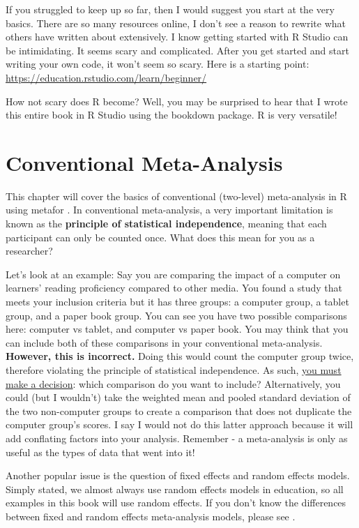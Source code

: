 \documentclass[
]{book}
\begin{document}
If you struggled to keep up so far, then I would suggest you start at the very basics. There are so many resources online, I don't see a reason to rewrite what others have written about extensively. I know getting started with R Studio can be intimidating. It seems scary and complicated. After you get started and start writing your own code, it won't seem so scary. Here is a starting point: \url{https://education.rstudio.com/learn/beginner/}

How not scary does R become? Well, you may be surprised to hear that I wrote this entire book in R Studio using the bookdown package. R is very versatile!

\hypertarget{meta}{%
\chapter{Conventional Meta-Analysis}\label{meta}}

This chapter will cover the basics of conventional (two-level) meta-analysis in R using metafor \citep{viechtbauer2010}. In conventional meta-analysis, a very important limitation is known as the \textbf{principle of statistical independence}, meaning that each participant can only be counted once. What does this mean for you as a researcher?

Let's look at an example: Say you are comparing the impact of a computer on learners' reading proficiency compared to other media. You found a study that meets your inclusion criteria but it has three groups: a computer group, a tablet group, and a paper book group. You can see you have two possible comparisons here: computer vs tablet, and computer vs paper book. You may think that you can include both of these comparisons in your conventional meta-analysis. \textbf{However, this is incorrect.} Doing this would count the computer group twice, therefore violating the principle of statistical independence. As such, \ul{you must make a decision}: which comparison do you want to include? Alternatively, you could (but I wouldn't) take the weighted mean and pooled standard deviation of the two non-computer groups to create a comparison that does not duplicate the computer group's scores. I say I would not do this latter approach because it will add conflating factors into your analysis. Remember - a meta-analysis is only as useful as the types of data that went into it!

Another popular issue is the question of fixed effects and random effects models. Simply stated, we almost always use random effects models in education, so all examples in this book will use random effects. If you don't know the differences between fixed and random effects meta-analysis models, please see \citep{borenstein2010}.
\end{document}
